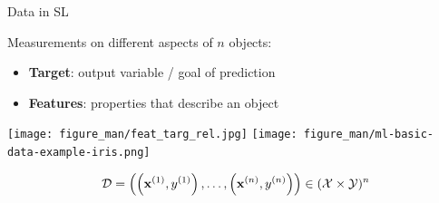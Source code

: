 \documentclass[11pt,compress,t,notes=noshow, xcolor=table]{beamer}
\begin{document}





\begin{vbframe}{Data in SL}


  Measurements on different aspects of $n$ objects:
  
  \begin{itemize}
  
    \item \textbf{Target}: output variable / goal of prediction

    \item \textbf{Features}: properties that describe an object 
    

  \end{itemize}
  \vspace{2em}
      

    \texttt{[image: figure\_man/feat\_targ\_rel.jpg]}
    \texttt{[image: figure\_man/ml-basic-data-example-iris.png]} 


\[
\mathcal{D} = \left( \left(\mathbf{x}^{(1)}, y^{(1)}\right), \ldots, \left(\mathbf{x}^{(n)}, y^{(n)}\right)\right) \in (\mathcal{X} \times \mathcal{Y})^n
\]


\end{vbframe}
\end{document}
